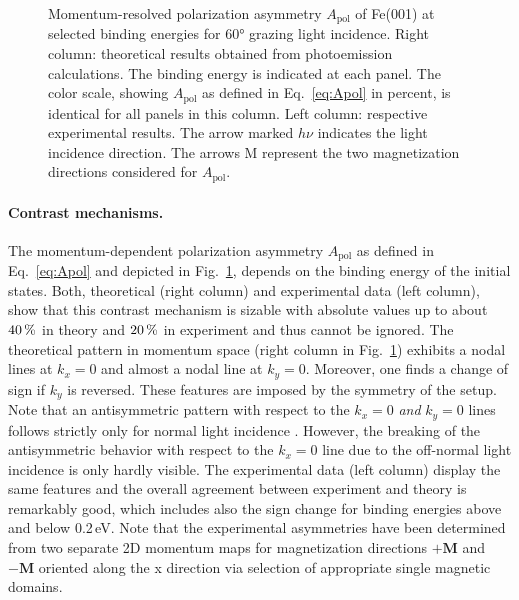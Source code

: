 \documentclass[prl,twocolumn,floatfix]{revtex4-2}
\renewcommand{\vec}[1]{\boldsymbol{#1}}
\newcommand{\rework}[1]{{\color{blue}{#1}}}
\begin{document}
\begin{figure}
    \caption{Momentum-resolved polarization asymmetry $A_{\mathrm{pol}}$ of Fe(001) at selected binding energies for 60° grazing light incidence. Right column: theoretical results obtained from photoemission calculations. The binding energy is indicated at each panel. The color scale, showing $A_{\mathrm{pol}}$ as defined in Eq.~\eqref{eq:Apol} in percent, is identical for all panels in this column. 
    Left column: respective experimental results. The arrow marked $h \nu$ indicates the light incidence direction. The arrows M represent the two magnetization directions considered for $A_{\mathrm{pol}}$. 
    }
    \label{fig:Apol}
\end{figure}


\paragraph{Contrast mechanisms.} 
The momentum-dependent polarization asymmetry $A_{\mathrm{pol}}$ as defined in Eq.~\eqref{eq:Apol} and depicted in Fig.~\ref{fig:Apol}, depends on the binding energy of the initial states. Both, theoretical (right column) and experimental data (left column), show that this contrast mechanism is sizable with absolute values up to about $\unit[40]{\%}$ in theory and $\unit[20]{\%}$ in experiment and thus cannot be ignored. 
The theoretical pattern in momentum space (right column in Fig.~\ref{fig:Apol}) exhibits a nodal lines at $k_{x} = 0$ and almost a nodal line at $k_{y} = 0$. Moreover, one finds a change of sign if $k_{y}$ is reversed. These features are imposed by the symmetry of the setup. Note that an antisymmetric pattern with respect to the $k_{x} = 0$ \textit{and} $k_{y} = 0$ lines follows strictly only for normal light incidence \cite{schumann2024}. However, the breaking of the antisymmetric behavior with respect to the $k_{x} = 0$ line due to the off-normal light incidence is only hardly visible. The experimental data (left column) display the same features and the overall agreement between experiment and theory is remarkably good, which includes also the sign change for binding energies above and below 0.2\,eV.
Note that the experimental asymmetries have been determined from two separate 2D momentum maps for magnetization directions $+\vec{M}$ and $-\vec{M}$ oriented along the x direction via selection of appropriate single magnetic domains.
\end{document}
